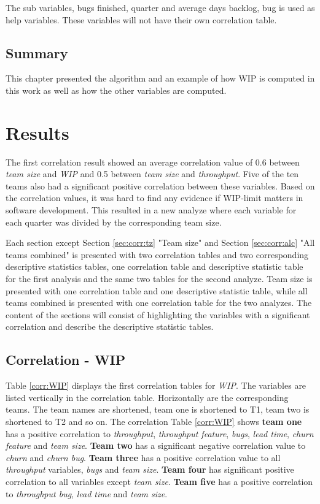 \documentclass[UKenglish]{ifimaster}  %
\begin{document}
The sub variables, bugs finished, quarter and average days backlog, bug is used as help variables. These variables will not have their own correlation table. 

\section{Summary}
This chapter presented the algorithm and an example of how WIP is computed in this work as well as how the other variables are computed.


\chapter{Results}                     
\label{ch:res}
The first correlation result showed an average correlation value  of 0.6 between \textit{team size} and \textit{WIP} and 0.5 between \textit{team size} and \textit{throughput}. Five of the ten teams also had a significant positive correlation between these variables. Based on the correlation values, it was hard to find any evidence if WIP-limit matters in software development. This resulted in a new analyze where each variable for each quarter was divided by the corresponding team size. 

Each section except Section \ref{sec:corr:tz} "Team size"  and Section \ref{sec:corr:alc} "All teams combined" is presented with two correlation tables and two corresponding descriptive statistics tables, one correlation table and descriptive statistic table for the first analysis and the same two tables for the second analyze. {Team size} is presented with one correlation table and one descriptive statistic table, while all teams combined is presented  with one correlation table for the two analyzes. The content of the sections will consist of highlighting the variables with a significant correlation and describe the descriptive statistic tables.
\section{Correlation - WIP}
\label{sec:corr:WIP}
Table \ref{corr:WIP} displays the first correlation tables for \textit{WIP}. The variables are listed vertically in the correlation table. Horizontally are the corresponding teams. The team names are shortened, team one is shortened to T1, team two is shortened to T2 and so on.
The correlation Table \ref{corr:WIP} shows \textbf{team one} has a positive correlation to \textit{throughput}, \textit{throughput feature}, \textit{bugs}, \textit{lead time}, \textit{churn feature} and \textit{team size}. \textbf{Team two} has a significant negative correlation value to \textit{churn} and \textit{churn bug}. \textbf{Team three} has a positive correlation value to all \textit{throughput} variables, \textit{bugs} and \textit{team size}. \textbf{Team four} has significant positive correlation to all variables except \textit{team size}. \textbf{Team five} has a positive correlation to \textit{throughput bug}, \textit{lead time} and \textit{team size}.
\end{document}
